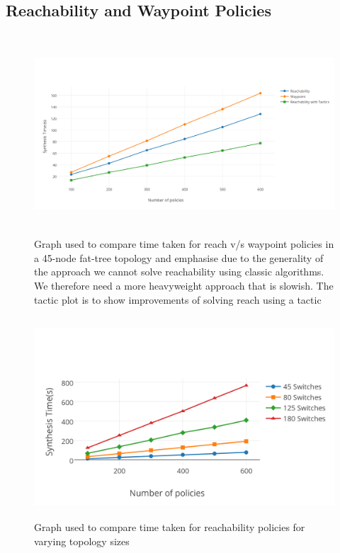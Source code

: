 \subsection{Reachability and Waypoint Policies}
\begin{figure}
	\includegraphics[height=7.5cm]{figures/reach-way-tactic.png}
	\caption{Graph used to compare time taken for reach v/s waypoint policies in a 45-node fat-tree topology and emphasise due to the generality of the approach we cannot solve reachability using classic algorithms. We therefore need a more heavyweight approach that is slowish. The tactic plot is to show improvements of solving reach using a tactic}
	\label{fig:reach-way-tactic}
\end{figure}
\begin{figure}
	\includegraphics[height=7.5cm]{figures/reach-topo.png}
	\caption{Graph used to compare time taken for reachability policies for varying topology sizes}
	\label{fig:reach-topo}
\end{figure}

